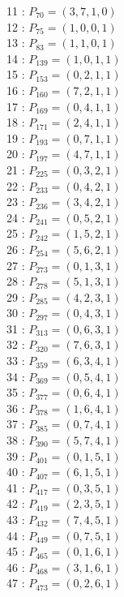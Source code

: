 \documentclass{article}
\begin{document}
{\begin{multicols}{3}
11 : $P_{70}=( 3, 7, 1, 0 )$\\
12 : $P_{75}=( 1, 0, 0, 1 )$\\
13 : $P_{83}=( 1, 1, 0, 1 )$\\
14 : $P_{139}=( 1, 0, 1, 1 )$\\
15 : $P_{153}=( 0, 2, 1, 1 )$\\
16 : $P_{160}=( 7, 2, 1, 1 )$\\
17 : $P_{169}=( 0, 4, 1, 1 )$\\
18 : $P_{171}=( 2, 4, 1, 1 )$\\
19 : $P_{193}=( 0, 7, 1, 1 )$\\
20 : $P_{197}=( 4, 7, 1, 1 )$\\
21 : $P_{225}=( 0, 3, 2, 1 )$\\
22 : $P_{233}=( 0, 4, 2, 1 )$\\
23 : $P_{236}=( 3, 4, 2, 1 )$\\
24 : $P_{241}=( 0, 5, 2, 1 )$\\
25 : $P_{242}=( 1, 5, 2, 1 )$\\
26 : $P_{254}=( 5, 6, 2, 1 )$\\
27 : $P_{273}=( 0, 1, 3, 1 )$\\
28 : $P_{278}=( 5, 1, 3, 1 )$\\
29 : $P_{285}=( 4, 2, 3, 1 )$\\
30 : $P_{297}=( 0, 4, 3, 1 )$\\
31 : $P_{313}=( 0, 6, 3, 1 )$\\
32 : $P_{320}=( 7, 6, 3, 1 )$\\
33 : $P_{359}=( 6, 3, 4, 1 )$\\
34 : $P_{369}=( 0, 5, 4, 1 )$\\
35 : $P_{377}=( 0, 6, 4, 1 )$\\
36 : $P_{378}=( 1, 6, 4, 1 )$\\
37 : $P_{385}=( 0, 7, 4, 1 )$\\
38 : $P_{390}=( 5, 7, 4, 1 )$\\
39 : $P_{401}=( 0, 1, 5, 1 )$\\
40 : $P_{407}=( 6, 1, 5, 1 )$\\
41 : $P_{417}=( 0, 3, 5, 1 )$\\
42 : $P_{419}=( 2, 3, 5, 1 )$\\
43 : $P_{432}=( 7, 4, 5, 1 )$\\
44 : $P_{449}=( 0, 7, 5, 1 )$\\
45 : $P_{465}=( 0, 1, 6, 1 )$\\
46 : $P_{468}=( 3, 1, 6, 1 )$\\
47 : $P_{473}=( 0, 2, 6, 1 )$\\

\end{multicols}}
\end{document}
